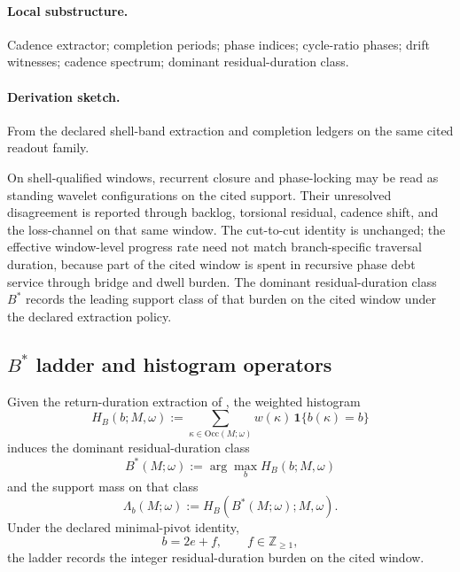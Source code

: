 \paragraph{Local substructure.} Cadence extractor; completion periods; phase indices; cycle-ratio phases; drift witnesses; cadence spectrum; dominant residual-duration class.
\paragraph{Derivation sketch.} From the declared shell-band extraction and completion ledgers on the same cited readout family.
\begin{remarkx}
On shell-qualified windows, recurrent closure and phase-locking may be read as standing wavelet configurations on the cited support. Their unresolved disagreement is reported through backlog, torsional residual, cadence shift, and the loss-channel on that same window. The cut-to-cut identity is unchanged; the effective window-level progress rate need not match branch-specific traversal duration, because part of the cited window is spent in recursive phase debt service through bridge and dwell burden. The dominant residual-duration class $B^*$ records the leading support class of that burden on the cited window under the declared extraction policy.
\end{remarkx}

\subsection{\texorpdfstring{$B^*$}{B*} ladder and histogram operators}\label{subsec:bstar-ladder-operators}
\begin{definition}
\label{def:bstar-operator}
Given the return-duration extraction of , the weighted histogram
\[
H_B(b;M,\omega):=\sum_{\kappa\in\mathrm{Occ}(M;\omega)} w(\kappa)\,\mathbf 1\{b(\kappa)=b\}
\]
induces the dominant residual-duration class
\[
B^*(M;\omega):=\arg\max_b H_B(b;M,\omega)
\]
and the support mass on that class
\[
\Lambda_b(M;\omega):=H_B(B^*(M;\omega);M,\omega).
\]
Under the declared minimal-pivot identity,
\[
b=2e+f,
\qquad f\in\mathbb Z_{\ge1},
\]
the ladder records the integer residual-duration burden on the cited window.
\end{definition}

